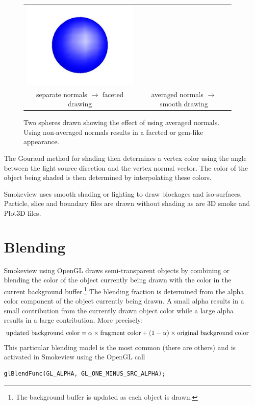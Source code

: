 \documentclass[11pt,twoside]{book}
\newcommand{\figoptions}{htp}
\begin{document}
\begin{figure}[\figoptions]
\begin{center}
\begin{tabular}{cc}
\includegraphics[width=3.0in]{figures/sphere_lit}\\
separate normals $\rightarrow$ faceted drawing&averaged normals $\rightarrow$ smooth drawing\\
\end{tabular}
\end{center}
\caption {Two spheres drawn showing the effect of using averaged
normals.  Using non-averaged normals results in a faceted or
gem-like appearance. } \label{fignormals}
\end{figure}

The Gouraud method for shading then determines a vertex color
using the angle between the light source direction and the vertex
normal vector. The color of the object being shaded is then
determined by interpolating these colors.

Smokeview uses smooth shading or lighting to draw blockages and
iso-surfaces. Particle, slice and boundary files are drawn without
shading as are 3D smoke and Plot3D files.


\section{Blending}
\label{blending}
Smokeview using OpenGL draws semi-transparent objects by combining or blending the color of the object currently being drawn with the color in the current background buffer.\footnote{The background buffer is updated as each object is drawn.}
The blending fraction is determined from the alpha color component of the object currently being drawn.
A small alpha results in a small contribution from the currently drawn object color while a large alpha results in a large contribution.  More precisely:
\begin{eqnarray*}
\noindent\mbox{updated background color} = \alpha\times \mbox{fragment color} + (1-\alpha)\times \mbox{original background color}
\end{eqnarray*}
This particular blending model is the most common (there are others) and is activated in Smokeview using the OpenGL call
\begin{verbatim}
glBlendFunc(GL_ALPHA, GL_ONE_MINUS_SRC_ALPHA);
\end{verbatim}
\end{document}
